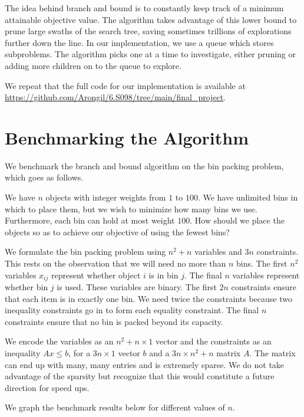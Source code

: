 \documentclass{article}
\begin{document}
The idea behind branch and bound is to constantly keep track of a minimum attainable objective value. The algorithm takes advantage of this lower bound to prune large swaths of the search tree, saving sometimes trillions of explorations further down the line. In our implementation, we use a queue which stores subproblems. The algorithm picks one at a time to investigate, either pruning or adding more children on to the queue to explore.

We repeat that the full code for our implementation is available at \url{https://github.com/Arongil/6.S098/tree/main/final_project}.

\section*{Benchmarking the Algorithm}

We benchmark the branch and bound algorithm on the bin packing problem, which goes as follows.

We have $n$ objects with integer weights from $1$ to $100$. We have unlimited bins in which to place them, but we wish to minimize how many bins we use. Furthermore, each bin can hold at most weight $100$. How should we place the objects so as to achieve our objective of using the fewest bins?

We formulate the bin packing problem using $n^2 + n$ variables and $3n$ constraints. This rests on the observation that we will need no more than $n$ bins. The first $n^2$ variables $x_{ij}$ represent whether object $i$ is in bin $j$. The final $n$ variables represent whether bin $j$ is used. These variables are binary. The first $2n$ constraints ensure that each item is in exactly one bin. We need twice the constraints because two inequality constraints go in to form each equality constraint. The final $n$ constraints ensure that no bin is packed beyond its capacity.

We encode the variables as an $n^2 + n \times 1$ vector and the constraints as an inequality $Ax \leq b$, for a $3n \times 1$ vector $b$ and a $3n \times n^2 + n$ matrix $A$. The matrix can end up with many, many entries and is extremely sparse. We do not take advantage of the sparsity but recognize that this would constitute a future direction for speed ups.

We graph the benchmark results below for different values of $n$.
\end{document}
